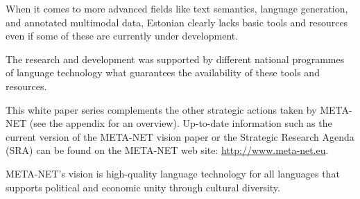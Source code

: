 \begin{multicols}{2}
When it comes to more advanced fields like text semantics, language generation, and annotated multimodal data, Estonian clearly lacks basic tools and resources even if some of these are currently under development. 

The research and development was supported by different national programmes of language technology what guarantees the availability of these tools and resources.


This white paper series complements the other strategic actions taken
by META-NET (see the appendix for an overview). Up-to-date information
such as the current version of the META-NET vision paper \cite{Meta1}
or the Strategic Research Agenda (SRA) can be found on the META-NET
web site: \url{http://www.meta-net.eu}. 

META-NET’s vision is high-quality language technology for all languages that supports political and economic unity through cultural diversity. 

\end{multicols}

\clearpage


